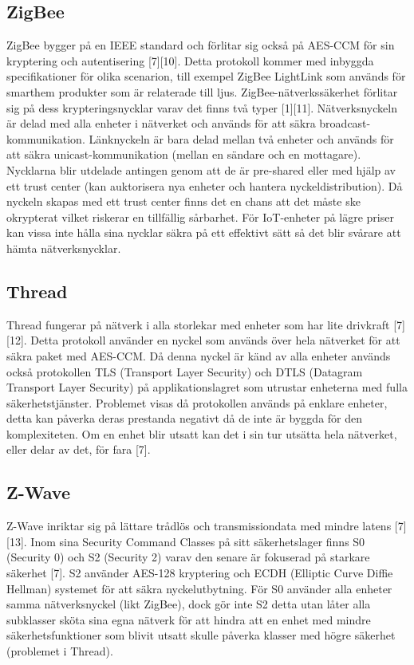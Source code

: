 \documentclass[conference]{IEEEtran}
\begin{document}
\subsection{ZigBee}
ZigBee bygger på en IEEE standard och förlitar sig också på AES-CCM för sin kryptering och autentisering [7][10]. Detta protokoll kommer med inbyggda specifikationer för olika scenarion, till exempel ZigBee LightLink som används för smarthem produkter som är relaterade till ljus. ZigBee-nätverkssäkerhet förlitar sig på dess krypteringsnycklar varav det finns två typer [1][11]. Nätverksnyckeln är delad med alla enheter i nätverket och används för att säkra broadcast-kommunikation. Länknyckeln är bara delad mellan två enheter och används för att säkra unicast-kommunikation (mellan en sändare och en mottagare). Nycklarna blir utdelade antingen genom att de är pre-shared eller med hjälp av ett trust center (kan auktorisera nya enheter och hantera nyckeldistribution). Då nyckeln skapas med ett trust center finns det en chans att det måste ske okrypterat vilket riskerar en tillfällig sårbarhet. För IoT-enheter på lägre priser kan vissa inte hålla sina nycklar säkra på ett effektivt sätt så det blir svårare att hämta nätverksnycklar. 

\subsection{Thread}
Thread fungerar på nätverk i alla storlekar med enheter som har lite drivkraft [7][12]. Detta protokoll använder en nyckel som används över hela nätverket för att säkra paket med AES-CCM. Då denna nyckel är känd av alla enheter används också protokollen TLS (Transport Layer Security) och DTLS (Datagram Transport Layer Security) på applikationslagret som utrustar enheterna med fulla säkerhetstjänster. Problemet visas då protokollen används på enklare enheter, detta kan påverka deras prestanda negativt då de inte är byggda för den komplexiteten. Om en enhet blir utsatt kan det i sin tur utsätta hela nätverket, eller delar av det, för fara [7].

\subsection{Z-Wave}
Z-Wave inriktar sig på lättare trådlös och transmissiondata med mindre latens [7][13]. Inom sina Security Command Classes på sitt säkerhetslager finns S0 (Security 0) och S2 (Security 2) varav den senare är fokuserad på starkare säkerhet [7]. S2 använder AES-128 kryptering och ECDH (Elliptic Curve Diffie Hellman) systemet för att säkra nyckelutbytning. För S0 använder alla enheter samma nätverksnyckel (likt ZigBee), dock gör inte S2 detta utan låter alla subklasser sköta sina egna nätverk för att hindra att en enhet med mindre säkerhetsfunktioner som blivit utsatt skulle påverka klasser med högre säkerhet (problemet i Thread).
\end{document}
